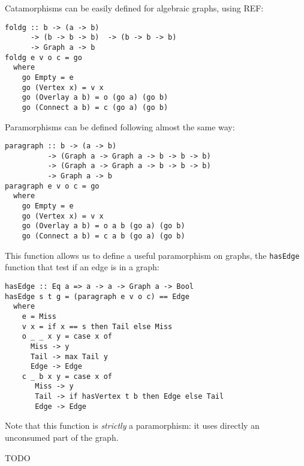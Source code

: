 \documentclass[format=sigplan]{acmart}
\begin{document}
Catamorphisms can be easily defined for algebraic graphs, using REF:
\begin{verbatim}
foldg :: b -> (a -> b)
      -> (b -> b -> b)  -> (b -> b -> b) 
      -> Graph a -> b
foldg e v o c = go
  where
    go Empty = e
    go (Vertex x) = v x
    go (Overlay a b) = o (go a) (go b)
    go (Connect a b) = c (go a) (go b)
\end{verbatim}

Paramorphisms can be defined following almost the same way:
\begin{verbatim}
paragraph :: b -> (a -> b) 
          -> (Graph a -> Graph a -> b -> b -> b) 
          -> (Graph a -> Graph a -> b -> b -> b) 
          -> Graph a -> b
paragraph e v o c = go
  where
    go Empty = e
    go (Vertex x) = v x
    go (Overlay a b) = o a b (go a) (go b)
    go (Connect a b) = c a b (go a) (go b)
\end{verbatim}

This function allows us to define a useful paramorphism on graphs, the \verb|hasEdge| function that test if an edge is in a graph:

\begin{verbatim}
hasEdge :: Eq a => a -> a -> Graph a -> Bool
hasEdge s t g = (paragraph e v o c) == Edge
  where
    e = Miss
    v x = if x == s then Tail else Miss
    o _ _ x y = case x of
      Miss -> y
      Tail -> max Tail y
      Edge -> Edge
    c _ b x y = case x of
       Miss -> y
       Tail -> if hasVertex t b then Edge else Tail
       Edge -> Edge
\end{verbatim}

Note that this function is \emph{strictly} a paramorphism: it uses directly an unconsumed part of the graph.

\begin{acks}
TODO
\end{acks}
	



\end{document}
